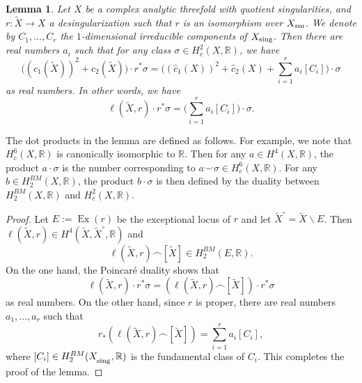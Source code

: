 \documentclass[12pt]{amsart}
\newcommand{\<}{\leq}
\newtheorem{lemma}[theorem]{Lemma}
\theoremstyle{remark}
\theoremstyle{definition}
\theoremstyle{definition}
\numberwithin{equation}{section}
\theoremstyle{definition}
\theoremstyle{definition}
\def\Ex{\operatorname{Ex}}
\def\sing{\operatorname{\textsubscript{\rm sing}}}
\begin{document}
\begin{lemma}
\label{lemma:c_2-difference}
Let $X$ be a complex analytic  threefold with quotient singularities, and $r\colon \widetilde{X}\to X$ a desingularization such that $r$ is an isomorphism over $X_{\rm sm}$.  
We denote by $C_1,...,C_r$ the $1$-dimensional irreducible components of $X_{\rm sing}$. 
Then there are real numbers $a_i$ such that for any class $\sigma \in H^{2}_c(X, \mathbb{R})$, we have 
\begin{equation*}\label{equation:compare}
 \Big(( c_1(\widetilde{X}))^2 + c_2(\widetilde{X}) \Big) \cdot r^*\sigma = \Big((\hat{c}_1(X))^2  + \hat{c}_2(X) + \sum_{i=1}^r a_i[C_i]\Big) \cdot \sigma   
\end{equation*} 
as real numbers. 
In other words, we have 
\[
\ell(\widetilde{X}, r) \cdot r^*\sigma = \Big(\sum_{i=1}^r a_i[C_i]  \Big) \cdot \sigma.
\]
\end{lemma}
 
The dot products in the lemma are defined as follows. 
For example, we note that $H^6_c(X,\mathbb{R})$ is canonically isomorphic to $\mathbb{R}$. 
Then for any  $a\in H^4(X,\mathbb{R})$, the product $a\cdot \sigma$  is the number corresponding to $a\smallsmile \sigma \in H^6_c(X,\mathbb{R})$. 
For any $b\in H^{BM}_2(X,\mathbb{R})$, the product $b\cdot \sigma$ is then defined by the duality between $H^{BM}_2(X,\mathbb{R})$ and $H^2_c(X,\mathbb{R})$. 


\begin{proof}%
Let $E:=\Ex(r)$ be the exceptional locus of $r$  and let $\widetilde{X}^\circ =\widetilde{X}\backslash {E}$. 
Then 
$\ell(\widetilde{X},r)  \in H^4(\widetilde{X}, \widetilde{X}^\circ, \mathbb{R})$ 
and 
\[\ell(\widetilde{X},r) \smallfrown [\widetilde{X}] \in  H^{BM}_2(E,\mathbb{R}).\] 
On the one hand, the Poincar\'e duality shows that 
\[
\ell(\widetilde{X}, r) \cdot r^*\sigma = (\ell(\widetilde{X},r) \smallfrown [\widetilde{X}]) \cdot r^*\sigma 
\]
as real numbers. 
On the other hand, since $r$ is proper,  there are real numbers $a_1,...,a_r$ such that
\begin{equation}\label{eqn:pushforward-of-relative-class} 
r_*{(\ell(\widetilde{X},r) \smallfrown [\widetilde{X}])} = \sum_{i=1}^r a_i[C_i],
\end{equation}
where $[C_i]\in H_2^{BM}(X_{\sing}, \mathbb{R})$ is the fundamental class of $C_i$. 
This completes the proof of the lemma. 
\end{proof} 
\end{document}
